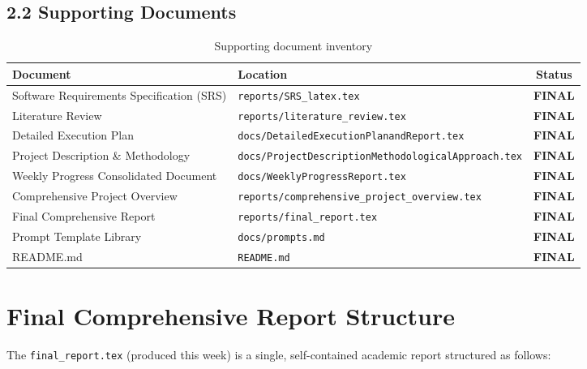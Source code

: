\documentclass[a4paper,11pt]{article}
\newcommand{\statusgood}[1]{\colorbox{green!20}{\textbf{#1}}}
\begin{document}
\subsection{2.2 Supporting Documents}

\begin{table}[h]
\centering
\begin{tabularx}{\textwidth}{|l|l|c|}
\hline
\rowcolor{cyan!10}
\textbf{Document} & \textbf{Location} & \textbf{Status} \\
\hline
Software Requirements Specification (SRS) & \texttt{reports/SRS\_latex.tex} & \statusgood{FINAL} \\
Literature Review & \texttt{reports/literature\_review.tex} & \statusgood{FINAL} \\
Detailed Execution Plan & \texttt{docs/DetailedExecutionPlanandReport.tex} & \statusgood{FINAL} \\
Project Description \& Methodology & \texttt{docs/ProjectDescriptionMethodologicalApproach.tex} & \statusgood{FINAL} \\
Weekly Progress Consolidated Document & \texttt{docs/WeeklyProgressReport.tex} & \statusgood{FINAL} \\
Comprehensive Project Overview & \texttt{reports/comprehensive\_project\_overview.tex} & \statusgood{FINAL} \\
Final Comprehensive Report & \texttt{reports/final\_report.tex} & \statusgood{FINAL} \\
Prompt Template Library & \texttt{docs/prompts.md} & \statusgood{FINAL} \\
README.md & \texttt{README.md} & \statusgood{FINAL} \\
\hline
\end{tabularx}
\caption{Supporting document inventory}
\end{table}

\section{Final Comprehensive Report Structure}

The \texttt{final\_report.tex} (produced this week) is a single, self-contained academic report structured as follows:
\end{document}
